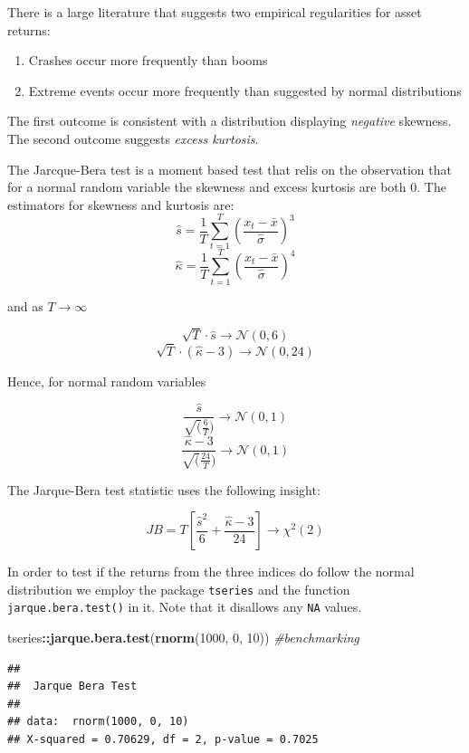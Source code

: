 \documentclass[11pt,]{article}
\newenvironment{Shaded}{\begin{snugshade}}{\end{snugshade}}
\newcommand{\KeywordTok}[1]{\textcolor[rgb]{0.13,0.29,0.53}{\textbf{#1}}}
\newcommand{\DecValTok}[1]{\textcolor[rgb]{0.00,0.00,0.81}{#1}}
\newcommand{\CommentTok}[1]{\textcolor[rgb]{0.56,0.35,0.01}{\textit{#1}}}
\newcommand{\OperatorTok}[1]{\textcolor[rgb]{0.81,0.36,0.00}{\textbf{#1}}}
\newcommand{\NormalTok}[1]{#1}
\providecommand{\tightlist}{%
  \setlength{\itemsep}{0pt}\setlength{\parskip}{0pt}}
\begin{document}
There is a large literature that suggests two empirical regularities for
asset returns:

\begin{enumerate}
\def\labelenumi{\arabic{enumi}.}
\tightlist
\item
  Crashes occur more frequently than booms
\item
  Extreme events occur more frequently than suggested by normal
  distributions
\end{enumerate}

The first outcome is consistent with a distribution displaying
\emph{negative} skewness. The second outcome suggests \emph{excess
kurtosis}.

The Jarcque-Bera test is a moment based test that relis on the
observation that for a normal random variable the skewness and excess
kurtosis are both 0. The estimators for skewness and kurtosis are:
\[\hat{s} = \frac{1}{T}\sum_{t=1}^T (\frac{x_t-\bar{x}}{\hat{\sigma}})^3\]
\[\hat{\kappa} = \frac{1}{T}\sum_{t=1}^T (\frac{x_t-\bar{x}}{\hat{\sigma}})^4\]

and as \(T\to \infty\)

\[\sqrt T\cdot \hat{s} \to \mathcal{N}(0, 6)\]
\[\sqrt T\cdot (\hat{\kappa}-3) \to \mathcal{N}(0, 24)\]

Hence, for normal random variables

\[\frac{\hat{s}}{\sqrt(\frac{6}{T})}\to \mathcal{N}(0,1)\]
\[\frac{\hat{\kappa}-3}{\sqrt(\frac{24}{T})}\to \mathcal{N}(0,1)\]

The Jarque-Bera test statistic uses the following insight:

\[JB = T[\frac{\hat{s}^2}{6}+\frac{\hat{\kappa}-3}{24}]\to \chi^2(2)\]

In order to test if the returns from the three indices do follow the
normal distribution we employ the package \texttt{tseries} and the
function \texttt{jarque.bera.test()} in it. Note that it disallows any
\texttt{NA} values.

\begin{Shaded}
\begin{Highlighting}[]
\NormalTok{tseries}\OperatorTok{::}\KeywordTok{jarque.bera.test}\NormalTok{(}\KeywordTok{rnorm}\NormalTok{(}\DecValTok{1000}\NormalTok{, }\DecValTok{0}\NormalTok{, }\DecValTok{10}\NormalTok{)) }\CommentTok{#benchmarking}
\end{Highlighting}
\end{Shaded}

\begin{verbatim}
## 
##  Jarque Bera Test
## 
## data:  rnorm(1000, 0, 10)
## X-squared = 0.70629, df = 2, p-value = 0.7025
\end{verbatim}
\end{document}
